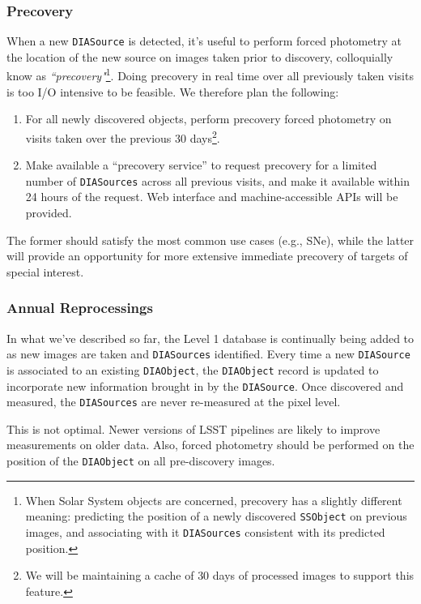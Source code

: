 \documentclass[12pt]{article}
\newcommand{\code}[1]{\texttt{#1}}
\newcommand{\DIASource}{\code{DIASource}\xspace}
\newcommand{\DIASources}{\code{DIASources}\xspace}
\newcommand{\DIAObject}{\code{DIAObject}\xspace}
\newcommand{\DB}{{Level 1 database}\xspace}
\newcommand{\SSObject}{\code{SSObject}\xspace}
\begin{document}
\subsubsection{Precovery}

When a new \DIASource is detected, it's useful to perform forced photometry at the location of the new source on images taken prior to discovery, colloquially know as {\em ``precovery"}\footnote{When Solar System objects are concerned, precovery has a slightly different meaning: predicting the position of a newly discovered \SSObject on previous images, and associating with it \DIASources consistent with its predicted position.}. Doing precovery in real time over all previously taken visits is too I/O intensive to be feasible. We therefore plan the following:
\begin{enumerate}
\item For all newly discovered objects, perform precovery forced photometry on visits taken over the previous 30 days\footnote{We will be maintaining a cache of $30$ days of processed images to support this feature.}.
\item Make available a ``precovery service'' to request precovery for a limited number of \DIASources across all previous visits, and make it available within 24 hours of the request. Web interface and machine-accessible APIs will be provided.
\end{enumerate}

The former should satisfy the most common use cases (e.g., SNe), while the latter will provide an opportunity for more extensive immediate precovery of targets of special interest.

\subsubsection{Annual Reprocessings}
\label{sec:l1dbreproc}

In what we've described so far, the \DB is continually being added to as new images are taken and \DIASources identified. Every time a new \DIASource is associated to an existing \DIAObject, the \DIAObject record is updated to incorporate new information brought in by the \DIASource. Once discovered and measured, the \DIASources are never re-measured at the pixel level.

This is not optimal. Newer versions of LSST pipelines are likely to improve measurements on older data. Also, forced photometry should be performed on the position of the \DIAObject on all pre-discovery images.
\end{document}
